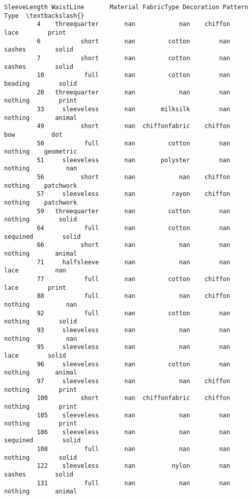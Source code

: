 \documentclass[11pt]{article}
\begin{document}
\begin{Verbatim}[commandchars=\\\{\}]
              SleeveLength WaistLine       Material FabricType Decoration Pattern Type  \textbackslash{}
         4    threequarter       nan            nan    chiffon       lace        print   
         6           short       nan         cotton        nan     sashes        solid   
         7           short       nan         cotton        nan     sashes        solid   
         10           full       nan         cotton        nan    beading        solid   
         20   threequarter       nan            nan        nan    nothing        print   
         33     sleeveless       nan       milksilk        nan    nothing       animal   
         49          short       nan  chiffonfabric    chiffon        bow          dot   
         50           full       nan         cotton        nan    nothing    geometric   
         51     sleeveless       nan       polyster        nan    nothing          nan   
         56          short       nan            nan    chiffon    nothing    patchwork   
         57     sleeveless       nan          rayon    chiffon    nothing    patchwork   
         59   threequarter       nan         cotton        nan    nothing        solid   
         64           full       nan         cotton        nan   sequined        solid   
         66          short       nan            nan        nan    nothing       animal   
         71     halfsleeve       nan            nan        nan       lace          nan   
         77           full       nan         cotton    chiffon       lace        print   
         88           full       nan            nan    chiffon    nothing          nan   
         92           full       nan         cotton        nan    nothing        solid   
         93     sleeveless       nan            nan        nan    nothing          nan   
         95     sleeveless       nan            nan        nan       lace        solid   
         96     sleeveless       nan         cotton        nan    nothing       animal   
         97     sleeveless       nan            nan    chiffon    nothing        print   
         100         short       nan  chiffonfabric    chiffon    nothing        print   
         105    sleeveless       nan            nan        nan    nothing        print   
         106    sleeveless       nan            nan        nan   sequined        solid   
         108          full       nan            nan        nan    nothing        solid   
         122    sleeveless       nan          nylon        nan     sashes        solid   
         131          full       nan            nan        nan    nothing       animal   

\end{Verbatim}
\end{document}
